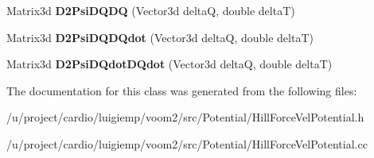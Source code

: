 \begin{DoxyCompactItemize}
\item 
\hypertarget{classvoom_1_1_hill_force_vel_potential_aff2e66980d3975614956c315145a63d5}{
Matrix3d {\bfseries D2PsiDQDQ} (Vector3d deltaQ, double deltaT)}
\label{classvoom_1_1_hill_force_vel_potential_aff2e66980d3975614956c315145a63d5}

\item 
\hypertarget{classvoom_1_1_hill_force_vel_potential_a2c116f98bbfeff296fc970a395918e97}{
Matrix3d {\bfseries D2PsiDQDQdot} (Vector3d deltaQ, double deltaT)}
\label{classvoom_1_1_hill_force_vel_potential_a2c116f98bbfeff296fc970a395918e97}

\item 
\hypertarget{classvoom_1_1_hill_force_vel_potential_a800216f286a9a0affba94ca02f5624a7}{
Matrix3d {\bfseries D2PsiDQdotDQdot} (Vector3d deltaQ, double deltaT)}
\label{classvoom_1_1_hill_force_vel_potential_a800216f286a9a0affba94ca02f5624a7}

\end{DoxyCompactItemize}


The documentation for this class was generated from the following files:\begin{DoxyCompactItemize}
\item 
/u/project/cardio/luigiemp/voom2/src/Potential/HillForceVelPotential.h\item 
/u/project/cardio/luigiemp/voom2/src/Potential/HillForceVelPotential.cc\end{DoxyCompactItemize}
